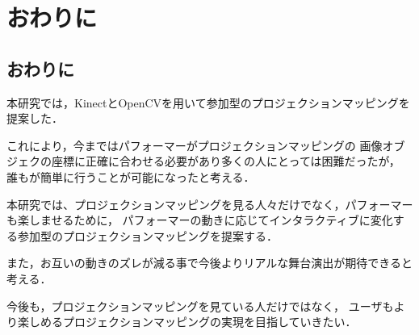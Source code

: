 \chapter{おわりに}
\thispagestyle{fancy}

\section{おわりに}

本研究では，KinectとOpenCVを用いて参加型のプロジェクションマッピングを提案した．

これにより，今まではパフォーマーがプロジェクションマッピングの
画像オブジェクの座標に正確に合わせる必要があり多くの人にとっては困難だったが，
誰もが簡単に行うことが可能になったと考える．

本研究では、プロジェクションマッピングを見る人々だけでなく，パフォーマーも楽しませるために，
パフォーマーの動きに応じてインタラクティブに変化する参加型のプロジェクションマッピングを提案する．

また，お互いの動きのズレが減る事で今後よりリアルな舞台演出が期待できると考える．

今後も，プロジェクションマッピングを見ている人だけではなく，
ユーザもより楽しめるプロジェクションマッピングの実現を目指していきたい．


